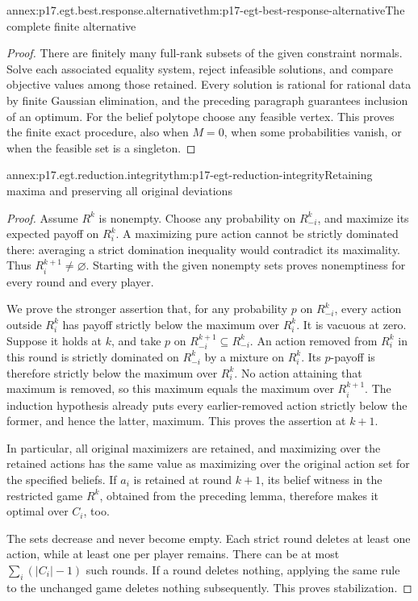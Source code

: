 \begin{annexitem}{annex:p17.egt.best.response.alternative}{thm:p17-egt-best-response-alternative}{The complete finite alternative}
\begin{proof}
There are finitely many full-rank subsets of the given constraint
normals. Solve each associated equality system, reject infeasible
solutions, and compare objective values among those retained.
Every solution is rational for rational data by finite Gaussian
elimination, and the preceding paragraph guarantees inclusion of
an optimum. For the belief polytope choose any feasible vertex.
This proves the finite exact procedure, also when \(M=0\), when
some probabilities vanish, or when the feasible set is a singleton.
\end{proof}
\end{annexitem}

\begin{annexitem}{annex:p17.egt.reduction.integrity}{thm:p17-egt-reduction-integrity}{Retaining maxima and preserving all original deviations}
\begin{proof}
Assume \(R^k\) is nonempty. Choose any probability on
\(R_{-i}^k\), and maximize its expected payoff on \(R_i^k\).
A maximizing pure action cannot be strictly dominated there:
averaging a strict domination inequality would contradict
its maximality. Thus \(R_i^{k+1}\ne\varnothing\).
Starting with the given nonempty sets proves nonemptiness
for every round and every player.

We prove the stronger assertion that, for any probability \(p\)
on \(R_{-i}^k\), every action outside \(R_i^k\) has payoff
strictly below the maximum over \(R_i^k\). It is vacuous at zero.
Suppose it holds at \(k\), and take \(p\) on
\(R_{-i}^{k+1}\subseteq R_{-i}^k\).
An action removed from \(R_i^k\) in this round is strictly
dominated on \(R_{-i}^k\) by a mixture on \(R_i^k\).
Its \(p\)-payoff is therefore strictly below the maximum
over \(R_i^k\). No action attaining that maximum is removed,
so this maximum equals the maximum over \(R_i^{k+1}\).
The induction hypothesis already puts every earlier-removed
action strictly below the former, and hence the latter, maximum.
This proves the assertion at \(k+1\).

In particular, all original maximizers are retained, and maximizing
over the retained actions has the same value as maximizing over
the original action set for the specified beliefs. If \(a_i\)
is retained at round \(k+1\), its belief witness in the restricted
game \(R^k\), obtained from the preceding lemma, therefore makes
it optimal over \(C_i\), too.

The sets decrease and never become empty. Each strict round
deletes at least one action, while at least one per player remains.
There can be at most \(\sum_i(|C_i|-1)\) such rounds.
If a round deletes nothing, applying the same rule to the unchanged
game deletes nothing subsequently. This proves stabilization.
\end{proof}
\end{annexitem}

